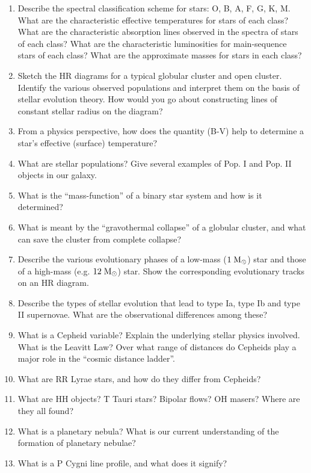 \documentclass[11pt, oneside]{book}
\begin{document}
\begin{enumerate}[start=16, itemsep=0.4cm]
    \item Describe the spectral classification scheme for stars: O, B, A, F, G, K, M. What are the characteristic effective temperatures for stars of each class? What are the characteristic absorption lines observed in the spectra of stars of each class? What are the characteristic luminosities for main-sequence stars of each class? What are the approximate masses for stars in each class?
    \item Sketch the HR diagrams for a typical globular cluster and open cluster. Identify the various observed populations and interpret them on the basis of stellar evolution theory. How would you go about constructing lines of constant stellar radius on the diagram?
    \item From a physics perspective, how does the quantity (B-V) help to determine a star's effective (surface) temperature?
    \item What are stellar populations? Give several examples of Pop. I and Pop. II objects in our galaxy.
    \item What is the ``mass-function'' of a binary star system and how is it determined?
    \item What is meant by the ``gravothermal collapse'' of a globular cluster, and what can save the cluster from complete collapse?
    \item Describe the various evolutionary phases of a low-mass ($1 \; {\rm M_{\odot}}$) star and those of a high-mass (e.g. $12 \; {\rm M_{\odot}}$) star. Show the corresponding evolutionary tracks on an HR diagram.
    \item Describe the types of stellar evolution that lead to type Ia, type Ib and type II supernovae. What are the observational differences among these?
    \item What is a Cepheid variable? Explain the underlying stellar physics involved. What is the Leavitt Law? Over what range of distances do Cepheids play a major role in the ``cosmic distance ladder''.
    \item What are RR Lyrae stars, and how do they differ from Cepheids?
    \item What are HH objects? T Tauri stars? Bipolar flows? OH masers? Where are they all found?
    \item What is a planetary nebula? What is our current understanding of the formation of planetary nebulae?
    \item What is a P Cygni line profile, and what does it signify?

\end{enumerate}
\end{document}
